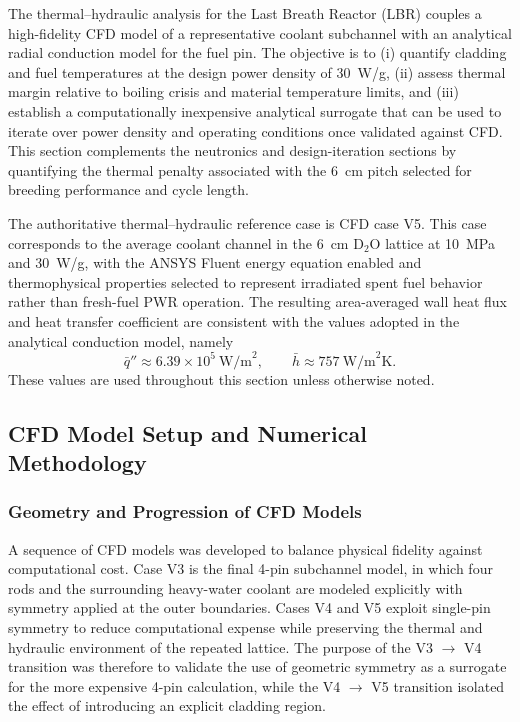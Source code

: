 The thermal--hydraulic analysis for the Last Breath Reactor (LBR) couples a high-fidelity CFD model of a representative coolant subchannel with an analytical radial conduction model for the fuel pin. The objective is to (i) quantify cladding and fuel temperatures at the design power density of 30~W/g, (ii) assess thermal margin relative to boiling crisis and material temperature limits, and (iii) establish a computationally inexpensive analytical surrogate that can be used to iterate over power density and operating conditions once validated against CFD. This section complements the neutronics and design-iteration sections by quantifying the thermal penalty associated with the 6~cm pitch selected for breeding performance and cycle length.

The authoritative thermal--hydraulic reference case is CFD case V5. This case corresponds to the average coolant channel in the 6~cm D$_2$O lattice at 10~MPa and 30~W/g, with the ANSYS Fluent energy equation enabled and thermophysical properties selected to represent irradiated spent fuel behavior rather than fresh-fuel PWR operation. The resulting area-averaged wall heat flux and heat transfer coefficient are consistent with the values adopted in the analytical conduction model, namely
\[
\bar{q}'' \approx 6.39\times 10^5\ \text{W/m}^2,
\qquad
\bar{h} \approx 757\ \text{W/m}^2\text{K}.
\]
These values are used throughout this section unless otherwise noted.

\subsection{CFD Model Setup and Numerical Methodology}
\label{sec:cfd-setup}

\subsubsection{Geometry and Progression of CFD Models}

A sequence of CFD models was developed to balance physical fidelity against computational cost. Case V3 is the final 4-pin subchannel model, in which four rods and the surrounding heavy-water coolant are modeled explicitly with symmetry applied at the outer boundaries. Cases V4 and V5 exploit single-pin symmetry to reduce computational expense while preserving the thermal and hydraulic environment of the repeated lattice. The purpose of the V3 $\rightarrow$ V4 transition was therefore to validate the use of geometric symmetry as a surrogate for the more expensive 4-pin calculation, while the V4 $\rightarrow$ V5 transition isolated the effect of introducing an explicit cladding region.

